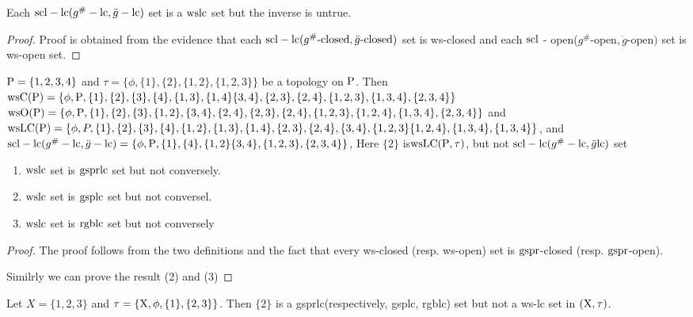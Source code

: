 \begin{thm}\label{thm6.2.16}
Each $\mathrm{scl} - \mathrm{lc}(g^{\text{\#}} -\mathrm{lc}, \ddot{g} -\mathrm{lc})$ set is a $\mathrm{wslc}$ set but the inverse is untrue.
\end{thm}

\begin{proof}
Proof is obtained from the evidence that each $\mathrm{scl} - \mathrm{lc}(g^{\text{\#}}\text{-closed}, \ddot{g}\text{-closed})$ set is ws-closed and each $\mathrm{scl}$ - open($g^{\text{\#}}\text{-open}, \ddot{g}\text{-open})$ set is ws-open set.
\end{proof}

\begin{exm}\label{exam6.2.17}
$\mathrm{P} = \{1, 2, 3, 4\}$ and $\tau = \{\phi, \{1\}, \{2\}, \{1,2\}, \{1,2,3\}\}$ be a topology on $\mathrm{P}$. Then $\ws\TSC(\TSP) = \{\phi, \TSP,\{1\}, \{2\}, \{3\}, \{4\}, \{1,3\}, \{1, 4\} \{3,4\}, \{2,3\}, \{2,4\},\break \{1,2, 3\},\{1,3,4\},\{2,3,4\}\}$ $\ws\TSO(\TSP)=\{\phi, \TSP, \{1\},\{2\},\{3\},\{1,2\}, \{3,4\}, \{2,4\}, \{2,3\},\break \{2,4\}, \{1,2,3\}, \{1,2,4\},\{1,3,4\},\{2,3,4\}\}$ and $\ws\LC(\TSP)=\{\phi,P,\{1\},\{2\},\{3\},\{4\},\break \{1,2\},\{1,3\},\{1,4\},\{2,3\},\{2,4\},\{3,4\},\{1,2,3\}\{1,2,4\},\{1,3,4\},\{1,3,4\}\}$, and $\mathrm{scl} - \mathrm{lc}(g^{\text{\#}} -\mathrm{lc}, \ddot{g} -\mathrm{lc}) = \{\phi, \mathrm{P},\{1\},\{4\},\{1,2\}\{3, 4\},\{1,2,3\},\{2,3,4\}\}$, Here $\{2\}$ is\break $\mathrm{ws}\mathrm{LC} (\mathrm{P}, \tau)$, but not $\mathrm{scl} - \mathrm{lc}(g^{\text{\#}} -\mathrm{lc}, \ddot{g} \mathrm{lc})$ set
\end{exm}

\begin{thm}\label{thm6.2.18}
\begin{enumerate}[(1)]
\item $\mathrm{wslc}$ set is $\mathrm{gsprlc}$ set but not conversely.
\item $\mathrm{wslc}$ set is $\mathrm{gsplc}$ set but not conversel.
\item $\mathrm{wslc}$ set is $\mathrm{rgblc}$ set but not conversely
\end{enumerate}
\end{thm}

\begin{proof}
The proof follows from the two definitions and the fact that every ws-closed (resp. ws-open) set is $\mathrm{gspr}$-closed (resp. $\mathrm{gspr}$-open).

Similrly we can prove the result (2) and (3)
\end{proof}

\begin{exm}\label{exam6.2.19}
Let $X= \{1,2, 3\}$ and $\tau=\{\mathrm{X}, \phi, \{1\}, \{2,3\}\}$. Then $\{2\}$ is a gsprlc(respectively, gsplc, rgblc) set but not a ws-lc set in $(\mathrm{X}, \tau)$.
\end{exm}

